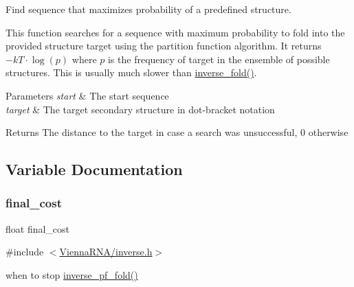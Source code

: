 Find sequence that maximizes probability of a predefined structure. 

This function searches for a sequence with maximum probability to fold into the provided structure \textquotesingle{}target\textquotesingle{} using the partition function algorithm. It returns $-kT \cdot \log(p)$ where $p$ is the frequency of \textquotesingle{}target\textquotesingle{} in the ensemble of possible structures. This is usually much slower than \hyperlink{group__inverse__fold_ga7af026de55d4babad879f2c92559cbbc}{inverse\+\_\+fold()}.


\begin{DoxyParams}{Parameters}
{\em start} & The start sequence \\
\hline
{\em target} & The target secondary structure in dot-\/bracket notation \\
\hline
\end{DoxyParams}
\begin{DoxyReturn}{Returns}
The distance to the target in case a search was unsuccessful, 0 otherwise 
\end{DoxyReturn}


\subsection{Variable Documentation}
\mbox{\label{group__inverse__fold_ga7f17d3b169af048d32bb185039a9c09c}} 
\subsubsection{\texorpdfstring{final\+\_\+cost}{final\_cost}}
{\footnotesize\ttfamily float final\+\_\+cost}



{\ttfamily \#include $<$\hyperlink{inverse_8h}{Vienna\+R\+N\+A/inverse.\+h}$>$}

when to stop \hyperlink{group__inverse__fold_gaeef52ecbf2a2450ad585a344f9826806}{inverse\+\_\+pf\+\_\+fold()} \mbox{\label{group__inverse__fold_ga7ec4ba51f86e1717a1e174264e4a75ce}} 
